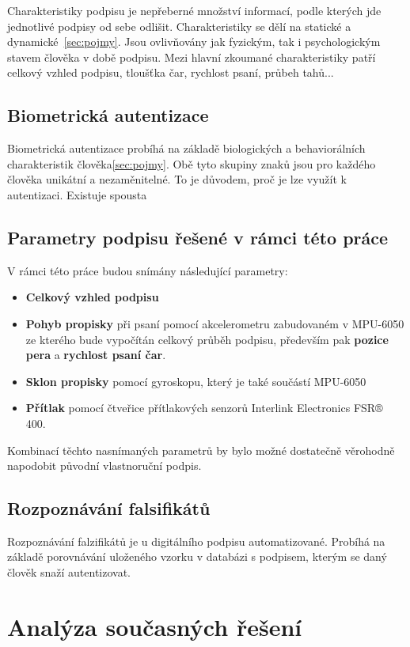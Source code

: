 Charakteristiky podpisu je nepřeberné množství informací, podle kterých jde jednotlivé podpisy od sebe odlišit. 
Charakteristiky se dělí na statické a dynamické~\ref{sec:pojmy}. 
Jsou ovlivňovány jak fyzickým, tak i psychologickým stavem člověka v době podpisu.
Mezi hlavní zkoumané charakteristiky patří celkový vzhled podpisu, tloušťka čar, rychlost psaní, průbeh tahů... %

\section{Biometrická autentizace}
Biometrická autentizace probíhá na základě biologických a behaviorálních charakteristik člověka\ref{sec:pojmy}. 
Obě tyto skupiny znaků jsou pro každého člověka unikátní a nezaměnitelné. To je důvodem, proč je lze využít k autentizaci.
Existuje spousta 

\section{Parametry podpisu řešené v rámci této práce}
V rámci této práce budou snímány následující parametry:
\begin{itemize}
  \item{\textbf{Celkový vzhled podpisu}}
  \item{\textbf{Pohyb propisky} při psaní pomocí akcelerometru zabudovaném v MPU-6050 ze kterého bude vypočítán celkový průběh podpisu, především pak \textbf{pozice pera} a \textbf{rychlost psaní čar}.}
  \item{\textbf{Sklon propisky} pomocí gyroskopu, který je také součástí MPU-6050}
  \item{\textbf{Přítlak} pomocí čtveřice přítlakových senzorů Interlink Electronics FSR® 400.}
\end{itemize}
Kombinací těchto nasnímaných parametrů by bylo možné dostatečně věrohodně napodobit původní vlastnoruční podpis. 

\section{Rozpoznávání falsifikátů}
Rozpoznávání falzifikátů je u digitálního podpisu automatizované.
Probíhá na základě porovnávání uloženého vzorku v databázi s podpisem, kterým se daný člověk snaží autentizovat. %


\chapter{Analýza současných řešení}
